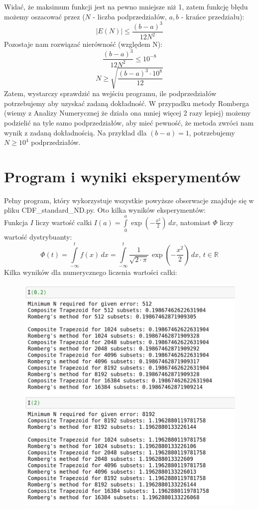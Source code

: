 \documentclass[a4paper]{article}
\begin{document}
Widać, że maksimum funkcji jest na pewno mniejsze niż 1, zatem funkcję błędu możemy oszacować przez ($N$ - liczba podprzedziałów, $a,b$ - krańce przedziału):
$$|E(N)| \leq \frac{(b-a)^3}{12N^2}$$
Pozostaje nam rozwiązać nierówność (względem N):
$$ \frac{(b-a)^3}{12N^2} \leq 10^{-8} $$
$$N \geq \sqrt{\frac{(b-a)^3 \cdot 10^{8}}{12}}$$
Zatem, wystarczy sprawdzić na wejściu programu, ile podprzedziałów potrzebujemy aby uzyskać zadaną dokładność. W przypadku metody Romberga (wiemy z Analizy Numerycznej że działa ona mniej więcej 2 razy lepiej) możemy podzielić na tyle samo podprzedziałów, aby mieć pewność, że metoda zwróci nam wynik z zadaną dokładnością. Na przykład dla $(b-a) = 1$, potrzebujemy $N \geq 10^4$ podprzedziałów.
\section{Program i wyniki eksperymentów}

Pełny program, który wykorzystuje wszystkie powyższe obserwacje znajduje się w pliku CDF\_standard\_ND.py. Oto kilka wyników eksperymentów:\\
Funkcja $I$ liczy wartość całki $I(a) = \int\limits_{0}^{a} \exp\left(-\frac{x^2}{2}\right)\,dx $, natomiast $\Phi$ liczy wartość dystrybuanty: $$\Phi(t) = \int\limits_{-\infty}^t f(x)\,dx = \int\limits_{-\infty}^t \frac{1}{\sqrt{2\cdot\pi}}\,\exp\left(-\frac{x^2}{2}\right)\,dx,\, t \in \mathbb{R}$$
Kilka wyników dla numerycznego liczenia wartości całki:
\begin{figure}[htbp]{}
\centerline{\includegraphics[scale=.25]{outputs_I.png}}
\label{fig:outputs_I}
\end{figure}
\end{document}
